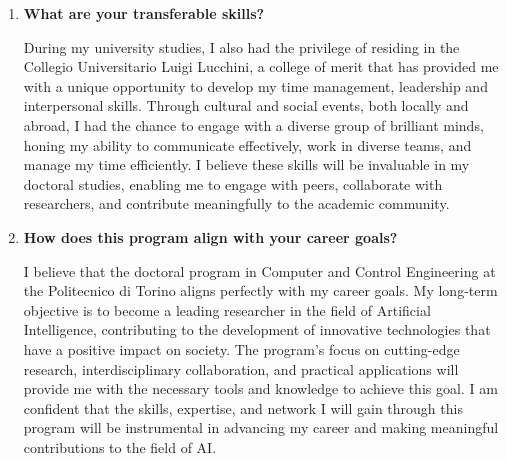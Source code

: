 \begin{enumerate}
    \item \textbf{What are your transferable skills?}

    During my university studies, I also had the privilege of residing in the Collegio Universitario Luigi Lucchini, a college of merit that has provided me with a unique opportunity to develop my time management, leadership and interpersonal skills. Through cultural and social events, both locally and abroad, I had the chance to engage with a diverse group of brilliant minds, honing my ability to communicate effectively, work in diverse teams, and manage my time efficiently. I believe these skills will be invaluable in my doctoral studies, enabling me to engage with peers, collaborate with researchers, and contribute meaningfully to the academic community.

    \item \textbf{How does this program align with your career goals?}

    I believe that the doctoral program in Computer and Control Engineering at the Politecnico di Torino aligns perfectly with my career goals. My long-term objective is to become a leading researcher in the field of Artificial Intelligence, contributing to the development of innovative technologies that have a positive impact on society. The program's focus on cutting-edge research, interdisciplinary collaboration, and practical applications will provide me with the necessary tools and knowledge to achieve this goal. I am confident that the skills, expertise, and network I will gain through this program will be instrumental in advancing my career and making meaningful contributions to the field of AI.
\end{enumerate}